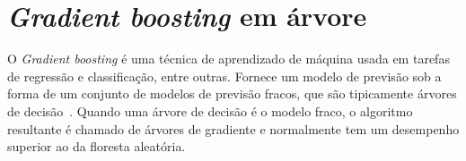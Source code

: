 \section{\textit{Gradient boosting} em árvore}
\label{sec:fun:gbt}

O \textit{Gradient boosting} é uma técnica de aprendizado de máquina usada em tarefas de regressão e classificação, entre outras.
Fornece um modelo de previsão sob a forma de um conjunto de modelos de previsão fracos, que são tipicamente árvores de decisão~\cite{gbta1,elementsofstatisticallearning}.
Quando uma árvore de decisão é o modelo fraco, o algoritmo resultante é chamado de árvores de gradiente e normalmente tem um desempenho superior ao da floresta aleatória.

